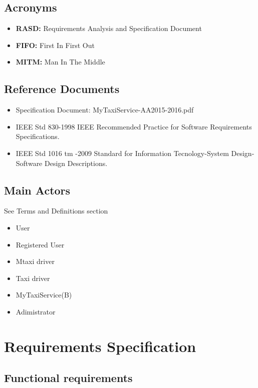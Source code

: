 \documentclass[11pt,titlepage]{article} %
\begin{document}
    \subsection{Acronyms}
      \begin{itemize}
		\item \textbf{RASD:} Requirements Analysis and Specification Document
      		\item \textbf{FIFO:} First In First Out
		\item \textbf{MITM:} Man In The Middle
      \end{itemize}

    \subsection{Reference Documents}
	\begin{itemize}
	      \item Specification Document: MyTaxiService-AA2015-2016.pdf
	      \item IEEE Std 830-1998 IEEE Recommended Practice for Software Requirements Specifications.
	      \item  IEEE Std 1016 tm -2009 Standard for Information Tecnology-System Design-Software Design Descriptions.
	\end{itemize}

      \subsection{Main Actors}
	See Terms and Definitions section
	\begin{itemize}
	        \item User
	        \item Registered User
	        \item Mtaxi driver
	        \item Taxi driver
	        \item MyTaxiService(B)
	        \item Adimistrator
	\end{itemize}

\section{Requirements Specification}
    \subsection{Functional requirements}
\end{document}
